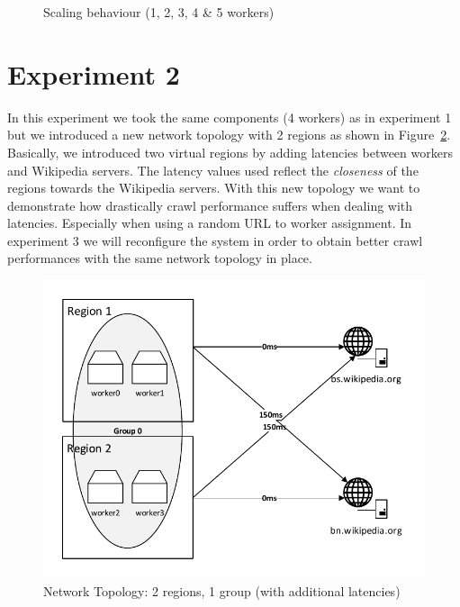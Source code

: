 \newline
\begin{figure}
\centering
\caption{Scaling behaviour (1, 2, 3, 4 \& 5 workers)}
\label{plot:exp_001}
\end{figure}

\section{Experiment 2}

In this experiment we took the same components (4 workers) as in experiment 1 but we introduced a new network topology with 2 regions as shown in Figure~\ref{topology_exp2}. Basically, we introduced two virtual regions by adding latencies between workers and Wikipedia servers. The latency values used reflect the \emph{closeness} of the regions towards the Wikipedia servers. With this new topology we want to demonstrate how drastically crawl performance suffers when dealing with latencies. Especially when using a random URL to worker assignment. In experiment 3 we will reconfigure the system in order to obtain better crawl performances with the same network topology in place.

\begin{figure}[h]
\centering
  \includegraphics[width=1.0\textwidth]{Figures/topology_exp2.pdf}
  \caption{Network Topology: 2 regions, 1 group (with additional latencies)}
\label{topology_exp2}
\end{figure}

